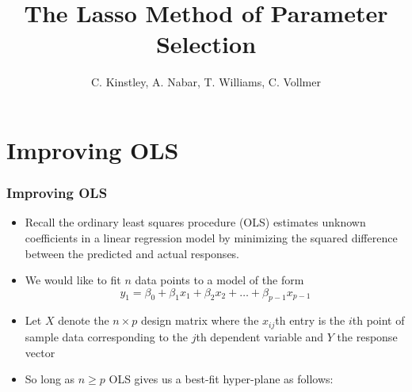 \documentclass{beamer}
\begin{document}
\title{The Lasso Method of Parameter Selection}
\author{C. Kinstley, A. Nabar, T. Williams, C. Vollmer }
\frame{\titlepage}

\section[Outline]{}

\section{Improving OLS}


\frame
{
\frametitle{Improving OLS}
	\begin{itemize}
	\item Recall the ordinary least squares procedure (OLS) estimates unknown coefficients in a linear regression model by minimizing the {\color{red}squared difference} between the {\color{purple}predicted} and {\color{blue}actual} responses. 
	
	\item We would like to fit $n$ data points to a model of the form {\color{purple}$$y_1= \beta_0 + \beta_1 x_1 + \beta_2 x_2+ \dots +\beta_{p-1} x_{p-1}$$}
	
	\item Let $X$ denote the $n \times p$ design matrix where the $x_{ij}$th entry is the $i$th point of sample data corresponding to the $j$th dependent variable and $Y$ the response vector
		
	
	\item  So long as $n \geq p$ OLS gives us a best-fit hyper-plane as follows:
	\end{itemize}
}
\end{document}
